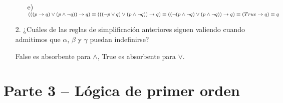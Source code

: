 \documentclass[10pt,a4paper]{article}
\begin{document}
\begin{enumerate}
\begin{enumerate}
	\item[e)]$(((p \rightarrow q) \vee (p \wedge \neg q)) \rightarrow q)\equiv \\
	(((\neg p \vee q) \vee (p \wedge \neg q)) \rightarrow q)\equiv \\
	((\neg (p \wedge \neg q) \vee (p \wedge \neg q)) \rightarrow q)\equiv \\
	(True \rightarrow q)\equiv q$	
	\end{enumerate}
\item[2.]¿Cuáles de las reglas de simplificación anteriores siguen valiendo cuando admitimos que $\alpha$,  $\beta$ y $\gamma$ puedan indefinirse?

False es absorbente para $\wedge$, True es absorbente para $\vee$.

\end{enumerate}
 
\section*{Parte 3 – Lógica de primer orden}
\end{document}
